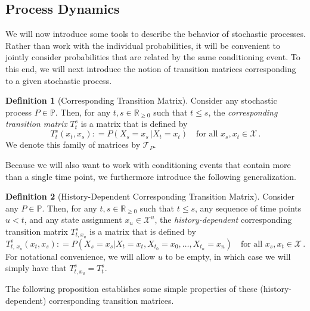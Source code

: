 \documentclass[10pt]{paper}
\theoremstyle{definition}
\newtheorem{definition}{Definition}
\newcommand{\reals}{\mathbb{R}}
\newcommand{\realsnonneg}{\reals_{\geq 0}}
\newcommand{\states}{\mathcal{X}}
\newcommand{\processes}{\mathbb{P}}
\newcommand{\coloneqq}{:\!=}
\begin{document}
\subsection{Process Dynamics}\label{sec:dynamics}

We will now introduce some tools to describe the behavior of stochastic processes. Rather than work with the individual probabilities, it will be convenient to jointly consider probabilities that are related by the same conditioning event. To this end, we will next introduce the notion of transition matrices corresponding to a given stochastic process.

\begin{definition}[Corresponding Transition Matrix]\label{def:trans_matrix}
Consider any stochastic process $P\in\processes$. Then, for any $t,s\in\realsnonneg$ such that $t\leq s$, the \emph{corresponding transition matrix} $T_t^s$ is a matrix that is defined by
\begin{equation*}
T_t^s(x_t, x_s) \coloneqq P(X_s=x_s\,\vert X_t=x_t)\quad\text{for all $x_s,x_t\in\states$}\,.
\end{equation*}
We denote this family of matrices by $\mathcal{T}_P$.%
\end{definition}

Because we will also want to work with conditioning events that contain more than a single time point, we furthermore introduce the following generalization.

\begin{definition}[History-Dependent Corresponding Transition Matrix]
Consider any $P\in\processes$. Then, for any $t,s\in\realsnonneg$ such that $t\leq s$, any sequence of time points $u<t$, and any state assignment $x_u\in\states^u$, the \emph{history-dependent} corresponding transition matrix $T_{t,x_u}^s$ is a matrix that is defined by
\begin{equation*}
T^s_{t,\,x_u}(x_t,x_s)
\coloneqq
P(X_s=x_s\vert X_t=x_t, X_{t_0}=x_{0}, \dots, X_{t_n}=x_{n})\quad\text{for all $x_s,x_t\in\states$}\,.
\end{equation*}
For notational convenience, we will allow $u$ to be empty, in which case we will simply have that $T_{t,x_u}^s=T_t^s$.
\end{definition}

The following proposition establishes some simple properties of these (history-dependent) corresponding transition matrices.
\end{document}
